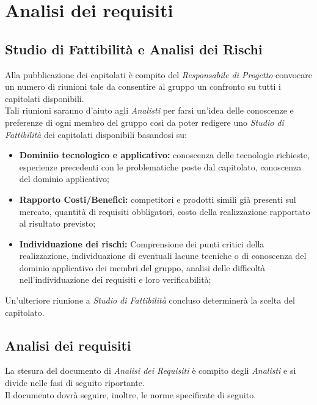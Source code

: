\section{Analisi dei requisiti}
  \subsection{Studio di Fattibilità e Analisi dei Rischi}
    Alla pubblicazione dei capitolati è compito del \emph{Responsabile di Progetto} convocare un numero di riunioni tale da consentire
    al gruppo un confronto su tutti i capitolati disponibili.\\
    Tali riunioni saranno d'aiuto agli \emph{Analisti} per farsi un'idea delle conoscenze e preferenze di ogni membro del gruppo così da
    poter redigere uno \emph{Studio di Fattibilità} dei capitolati disponibili basandosi su:\\
    \begin{itemize}
      \item \textbf{Dominiio tecnologico e applicativo: }conoscenza delle tecnologie richieste, esperienze precedenti con le problematiche poste dal capitolato, conoscenza del
      dominio applicativo;
      \item \textbf{Rapporto Costi/Benefici: }competitori e prodotti simili già presenti sul mercato, quantità di requisiti obbligatori, costo della realizzazione rapportato al
      risultato previsto;
      \item \textbf{Individuazione dei rischi: }Comprensione dei punti critici della realizzazione, individuazione di eventuali lacune tecniche o di conoscenza del dominio applicativo
      dei membri del gruppo, analisi delle difficoltà nell’individuazione dei requisiti e loro verificabilità;
    \end{itemize}
    Un'ulteriore riunione a \emph{Studio di Fattibilità} concluso determinerà la scelta del capitolato.
  \subsection{Analisi dei requisiti}
    La stesura del documento di \emph{Analisi dei Requisiti} è compito degli \emph{Analisti} e si divide nelle fasi di seguito riportante.\\
    Il documento dovrà seguire, inoltre, le norme specificate di seguito.
